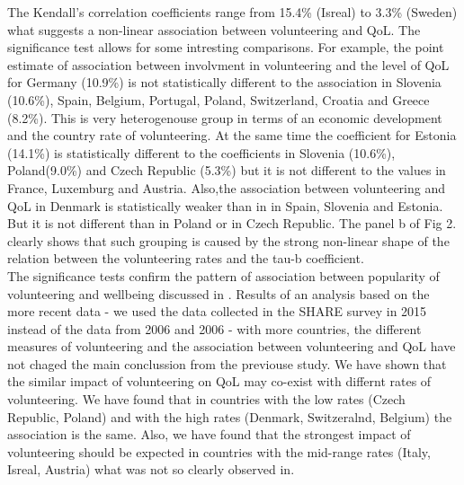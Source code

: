 \documentclass[10pt, letterpaper]{article}
\begin{document}
\begin{spacing}{1.4}
The Kendall's correlation coefficients range from 15.4\% (Isreal) to 3.3\% (Sweden) what suggests a non-linear association between volunteering and QoL. The significance test allows for some intresting comparisons. For example, the point estimate of association between involvment in volunteering and the level of QoL for Germany (10.9\%) is not statistically different to the association in Slovenia (10.6\%), Spain, Belgium, Portugal, Poland, Switzerland, Croatia and Greece (8.2\%). This is very heterogenouse group  in terms of an economic development and the country rate of volunteering. At the same time the coefficient for Estonia (14.1\%) is statistically different to the coefficients in Slovenia (10.6\%), Poland(9.0\%) and Czech Republic (5.3\%) but it is not different to the values in France, Luxemburg and Austria. Also,the association between volunteering and QoL in Denmark is statistically weaker than in in Spain, Slovenia and Estonia. But it is not different than in Poland or in Czech Republic.  The panel b of Fig 2. clearly shows that such grouping is caused by the strong non-linear shape of the relation between the volunteering rates and    the tau-b coefficient. \\ 

The significance tests confirm the pattern of association between  popularity of volunteering and wellbeing discussed in \citet{haski09}. Results of an analysis based on the more recent data  - we used the data collected in the SHARE survey in 2015 instead of the data from 2006 and 2006 - with more countries, the different measures of volunteering and the association between volunteering and QoL have not chaged the main conclussion from the previouse study. We have shown that the similar impact of volunteering on QoL may co-exist with differnt rates of volunteering. We have found that in countries with the low rates (Czech Republic, Poland) and with the high rates (Denmark, Switzeralnd, Belgium) the association is the same. Also, we have found that the strongest impact of volunteering should be expected in countries with the mid-range rates (Italy, Isreal, Austria) what was not so clearly observed in\citet{haski09}. \\


\end{spacing}
\end{document}
